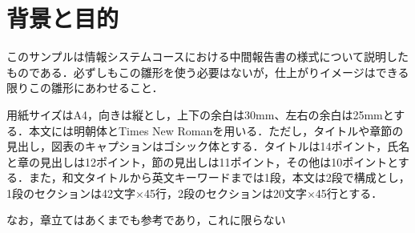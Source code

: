 \section{背景と目的}

このサンプルは情報システムコースにおける中間報告書の様式について説明したものである．必ずしもこの雛形を使う必要はないが，仕上がりイメージはできる限りこの雛形にあわせること．

用紙サイズはA4，向きは縦とし，上下の余白は30mm、左右の余白は25mmとする．本文には明朝体とTimes New Romanを用いる．ただし，タイトルや章節の見出し，図表のキャプションはゴシック体とする．タイトルは14ポイント，氏名と章の見出しは12ポイント，節の見出しは11ポイント，その他は10ポイントとする．また，和文タイトルから英文キーワードまでは1段，本文は2段で構成とし，1段のセクションは42文字×45行，2段のセクションは20文字×45行とする．

なお，章立てはあくまでも参考であり，\cite{DeepQNet}これに限らない